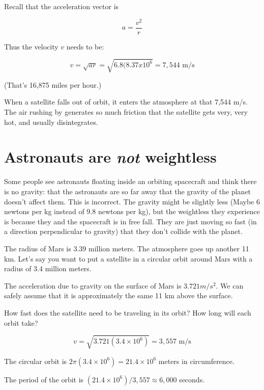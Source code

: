 Recall that the acceleration vector is

$$a = \frac{v^2}{r}$$

Thus the velocity $v$ needs to be:

$$v = \sqrt{a r} = \sqrt{6.8(8.37 x 10^6} = 7,544 \text{ m/s}$$

(That's 16,875 miles per hour.)

When a satellite falls out of orbit, it enters the atmosphere at that
7,544 m/s.  The air rushing by generates so much friction that the
satellite gets very, very hot, and usually disintegrates.

\section{Astronauts are \emph{not} weightless}

Some people see astronauts floating inside an orbiting spacecraft and
think there is no gravity: that the astronauts are so far away that
the gravity of the planet doesn't affect them. This is incorrect.  The
gravity might be slightly less (Maybe 6 newtons per kg instead of 9.8
newtons per kg), but the weightless they experience is because they
and the spacecraft is in free fall.  They are just moving so fast (in
a direction perpendicular to gravity) that they don't collide with the
planet.



\begin{Exercise}[title={Mars Orbit}, label=mars_orbit]
  
  The radius of Mars is 3.39 million meters. The atmosphere goes up
  another 11 km.  Let's say you want to put a satellite in a circular
  orbit around Mars with a radius of 3.4 million meters.

  The acceleration due to gravity on the surface of Mars is $3.721
  m/s^2$. We can safely assume that it is approximately the same 11 km
  above the surface.

  How fast does the satellite need to be traveling in its orbit?  How
  long will each orbit take?

\end{Exercise}
\begin{Answer}[ref=circular]
  $$v = \sqrt{3.721(3.4 \times 10^6)} = 3,557\text{ m/s}$$

  The circular orbit is $2\pi(3.4 \times 10^6) = 21.4 \times 10^6$ meters in circumference.

  The period of the orbit is $(21.4 \times 10^6)/3,557 \approx 6,000$ seconds.
\end{Answer}

